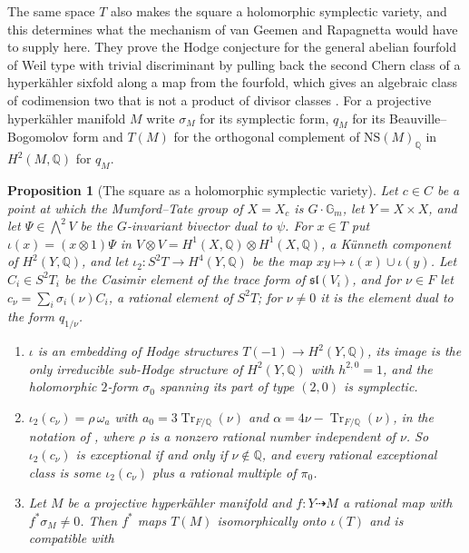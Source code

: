\documentclass[11pt,reqno]{amsart}
\theoremstyle{plain}
\newtheorem{proposition}[theorem]{Proposition}
\theoremstyle{definition}
\theoremstyle{remark}
\newcommand{\QQ}{\mathbb{Q}}
\newcommand{\NS}{\mathrm{NS}}
\DeclareMathOperator{\Tr}{Tr}
\begin{document}
The same space $T$ also makes the square a holomorphic symplectic variety,
and this determines what the mechanism of van Geemen and Rapagnetta would
have to supply here. They prove the Hodge conjecture for the general abelian
fourfold of Weil type with trivial discriminant by pulling back the second
Chern class of a hyperk\"ahler sixfold along a map from the fourfold, which
gives an algebraic class of codimension two that is not a product of divisor
classes \cite{vGR26}. For a projective hyperk\"ahler manifold $M$ write
$\sigma_{M}$ for its symplectic form, $q_{M}$ for its Beauville--Bogomolov
form and $T(M)$ for the orthogonal complement of $\NS(M)_{\QQ}$ in
$H^{2}(M,\QQ)$ for $q_{M}$.

\begin{proposition}[The square as a holomorphic symplectic
variety]\label{prop:hksquare}
Let $c\in C$ be a point at which the Mumford--Tate group of $X=X_{c}$ is
$G\cdot\mathbb{G}_{m}$, let $Y=X\times X$, and let $\Psi\in\bigwedge^{2}V$ be
the $G$-invariant bivector dual to $\psi$. For $x\in T$ put
$\iota(x)=(x\otimes1)\Psi$ in $V\otimes V=H^{1}(X,\QQ)\otimes H^{1}(X,\QQ)$, a
K\"unneth component of $H^{2}(Y,\QQ)$, and let $\iota_{2}\colon S^{2}T\to
H^{4}(Y,\QQ)$ be the map $xy\mapsto\iota(x)\cup\iota(y)$. Let $C_{i}\in
S^{2}T_{i}$ be the Casimir element of the trace form of
$\mathfrak{sl}(V_{i})$, and for $\nu\in F$ let
$c_{\nu}=\sum_{i}\sigma_{i}(\nu)C_{i}$, a rational element of $S^{2}T$; for
$\nu\ne0$ it is the element dual to the form $q_{1/\nu}$.
\begin{enumerate}[label=\textup{(\roman*)},leftmargin=2.6em,itemsep=2pt]
\item $\iota$ is an embedding of Hodge structures $T(-1)\to H^{2}(Y,\QQ)$, its
  image is the only irreducible sub-Hodge structure of $H^{2}(Y,\QQ)$ with
  $h^{2,0}=1$, and the holomorphic $2$-form $\sigma_{0}$ spanning its part of
  type $(2,0)$ is symplectic.
\item $\iota_{2}(c_{\nu})=\rho\,\omega_{a}$ with $a_{0}=3\Tr_{F/\QQ}(\nu)$ and
  $\alpha=4\nu-\Tr_{F/\QQ}(\nu)$, in the notation of ,
  where $\rho$ is a nonzero rational number independent of $\nu$. So
  $\iota_{2}(c_{\nu})$ is exceptional if and only if $\nu\notin\QQ$, and every
  rational exceptional class is some $\iota_{2}(c_{\nu})$ plus a rational
  multiple of $\pi_{0}$.
\item Let $M$ be a projective hyperk\"ahler manifold and
  $f\colon Y\dashrightarrow M$ a rational map with $f^{*}\sigma_{M}\ne0$. Then
  $f^{*}$ maps $T(M)$ isomorphically onto $\iota(T)$ and is compatible with

\end{enumerate}
\end{proposition}
\end{document}
